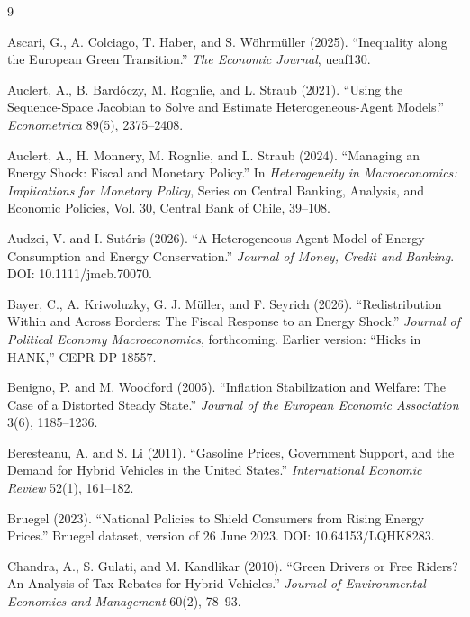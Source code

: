 \begin{thebibliography}{9}

Ascari, G., A. Colciago, T. Haber, and S. W\"ohrm\"uller (2025).
``Inequality along the European Green Transition.''
\emph{The Economic Journal}, ueaf130.

Auclert, A., B. Bard\'oczy, M. Rognlie, and L. Straub (2021).
``Using the Sequence-Space Jacobian to Solve and Estimate Heterogeneous-Agent
Models.'' \emph{Econometrica} 89(5), 2375--2408.

Auclert, A., H. Monnery, M. Rognlie, and L. Straub (2024).
``Managing an Energy Shock: Fiscal and Monetary Policy.''
In \emph{Heterogeneity in Macroeconomics: Implications for Monetary Policy},
Series on Central Banking, Analysis, and Economic Policies, Vol. 30,
Central Bank of Chile, 39--108.

Audzei, V. and I. Sut\'oris (2026).
``A Heterogeneous Agent Model of Energy Consumption and Energy Conservation.''
\emph{Journal of Money, Credit and Banking}. DOI: 10.1111/jmcb.70070.

Bayer, C., A. Kriwoluzky, G. J. M\"uller, and F. Seyrich (2026).
``Redistribution Within and Across Borders: The Fiscal Response to an Energy
Shock.'' \emph{Journal of Political Economy Macroeconomics}, forthcoming.
Earlier version: ``Hicks in HANK,'' CEPR DP 18557.

Benigno, P. and M. Woodford (2005).
``Inflation Stabilization and Welfare: The Case of a Distorted Steady State.''
\emph{Journal of the European Economic Association} 3(6), 1185--1236.

Beresteanu, A. and S. Li (2011).
``Gasoline Prices, Government Support, and the Demand for Hybrid Vehicles in the United States.''
\emph{International Economic Review} 52(1), 161--182.

Bruegel (2023).
``National Policies to Shield Consumers from Rising Energy Prices.''
Bruegel dataset, version of 26 June 2023. DOI: 10.64153/LQHK8283.

Chandra, A., S. Gulati, and M. Kandlikar (2010).
``Green Drivers or Free Riders? An Analysis of Tax Rebates for Hybrid Vehicles.''
\emph{Journal of Environmental Economics and Management} 60(2), 78--93.


\end{thebibliography}
